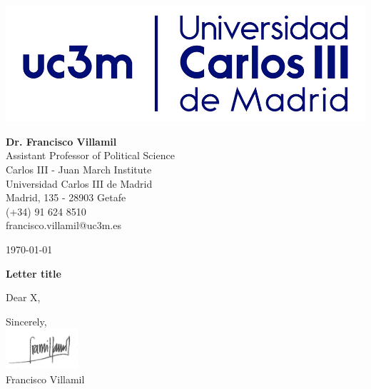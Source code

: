 \documentclass[a4paper, 12pt]{article}
\begin{document}
\thispagestyle{empty}

\begin{minipage}[t]{0.38\textwidth}
\begin{flushleft}
\noindent

\includegraphics[width = \textwidth]{img/UC3M_logo}
\end{flushleft}
\end{minipage}
\hfill
\begin{minipage}[t]{0.58\textwidth}
\begin{flushright}

\vspace{7pt}
{\footnotesize

{\bf Dr. Francisco Villamil}\\
Assistant Professor of Political Science\\
Carlos III - Juan March Institute\\
Universidad Carlos III de Madrid\\
Madrid, 135 - 28903 Getafe\\



(+34) 91 624 8510\\
francisco.villamil@uc3m.es\\
}
\end{flushright}
\end{minipage}

\vspace{28pt}

\noindent
\today


\noindent
\textbf{Letter title}

\vspace{5pt}

Dear X,


\vspace{20pt}
\noindent
Sincerely,\\
\includegraphics[width = 0.2\textwidth]{img/firma}\\\vspace{5pt}
Francisco Villamil

\end{document}
